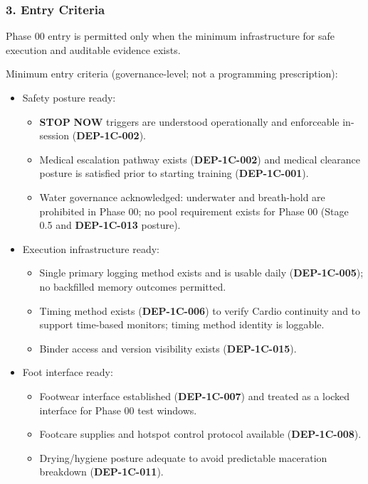 \documentclass[10pt]{article}
\begin{document}
\subsubsection*{3. Entry Criteria}

Phase 00 entry is permitted only when the minimum infrastructure for safe execution and auditable evidence exists.

Minimum entry criteria (governance-level; not a programming prescription):

\begin{itemize}
\item Safety posture ready:
  \begin{itemize}
  \item \textbf{STOP} \textbf{NOW} triggers are understood operationally and enforceable in-session (\textbf{DEP-1C-002}).
  \item Medical escalation pathway exists (\textbf{DEP-1C-002}) and medical clearance posture is satisfied prior to starting training (\textbf{DEP-1C-001}).
  \item Water governance acknowledged: underwater and breath-hold are prohibited in Phase 00; no pool requirement exists for Phase 00 (Stage 0.5 and \textbf{DEP-1C-013} posture).
  \end{itemize}

\item Execution infrastructure ready:
  \begin{itemize}
  \item Single primary logging method exists and is usable daily (\textbf{DEP-1C-005}); no backfilled memory outcomes permitted.
  \item Timing method exists (\textbf{DEP-1C-006}) to verify Cardio continuity and to support time-based monitors; timing method identity is loggable.
  \item Binder access and version visibility exists (\textbf{DEP-1C-015}).
  \end{itemize}

\item Foot interface ready:
  \begin{itemize}
  \item Footwear interface established (\textbf{DEP-1C-007}) and treated as a locked interface for Phase 00 test windows.
  \item Footcare supplies and hotspot control protocol available (\textbf{DEP-1C-008}).
  \item Drying/hygiene posture adequate to avoid predictable maceration breakdown (\textbf{DEP-1C-011}).
  \end{itemize}


\end{itemize}
\end{document}
